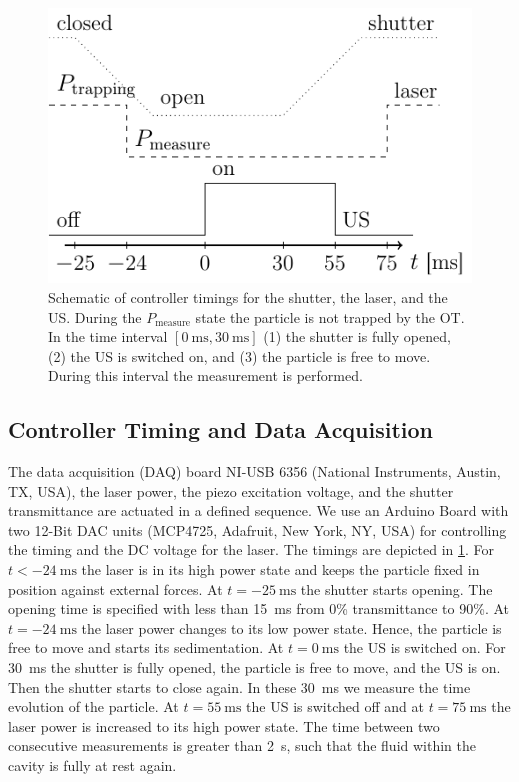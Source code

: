 \begin{figure}[H]
  \centering
  \includegraphics[]{Plots/cache/daq-sync.pdf}
  \caption{Schematic of controller timings for the shutter, the laser, and the 
      US. During the $P_{\text{measure}}$ state the particle is not trapped by 
  the OT. In the time interval $[\SI{0}{\ms}, \SI{30}{\ms}]$ (1) the shutter is 
  fully opened, (2) the US is switched on, and (3) the particle is free to 
  move. During this interval the measurement is performed.}\label{fig:TC-daq-sync}
\end{figure}

\subsection{Controller Timing and Data Acquisition}

The data acquisition (DAQ) board NI-USB 6356 (National Instruments, Austin, TX, 
USA), the laser power, the piezo excitation voltage, and the shutter 
transmittance are actuated in a defined sequence. We use an Arduino Board with 
two 12-Bit DAC units (MCP4725, Adafruit, New York, NY, USA) for controlling the 
timing and the DC voltage for the laser. The timings are depicted in 
\cref{fig:TC-daq-sync}. For $t<-\SI{24}{\ms}$ the laser is in its high power state 
and keeps the particle fixed in position against external forces. At 
$t=\SI{-25}{\ms}$ the shutter starts opening. The opening time is specified 
with less than \SI{15}{\ms} from 0\% transmittance to 90\%. At 
$t=\SI{-24}{\ms}$ the laser power changes to its low power state. Hence, the 
particle is free to move and starts its sedimentation. At $t=\SI{0}{\ms}$ the 
US is switched on. For \SI{30}{\ms} the shutter is fully opened, the particle 
is free to move, and the US is on. Then the shutter starts to close again. In 
these \SI{30}{\ms} we measure the time evolution of the particle. At 
$t=\SI{55}{\ms}$ the US is switched off and at $t=\SI{75}{\ms}$ the laser power 
is increased to its high power state. The time between two consecutive 
measurements is greater than \SI{2}{\s}, such that the fluid within the cavity 
is fully at rest again.

